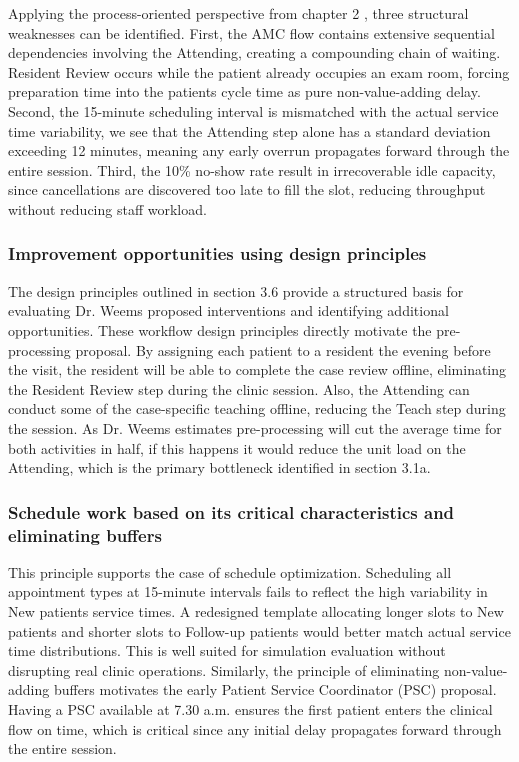 Applying the process-oriented perspective from chapter 2 \parencite{pensumbok}, three structural weaknesses can be identified. First, the AMC flow contains extensive sequential dependencies involving the Attending, creating a compounding chain of waiting. Resident Review occurs while the patient already occupies an exam room, forcing preparation time into the patients cycle time as pure non-value-adding delay. Second, the 15-minute scheduling interval is mismatched with the actual service time variability, we see that the Attending step alone has a standard deviation exceeding 12 minutes, meaning any early overrun propagates forward through the entire session. Third, the 10\% no-show rate result in irrecoverable idle capacity, since cancellations are discovered too late to fill the slot, reducing throughput without reducing staff workload. 

\subsubsection{Improvement opportunities using design principles}

The design principles outlined in section 3.6 \cite[p. 100-101]{pensumbok} provide a structured basis for evaluating Dr. Weems proposed interventions and identifying additional opportunities. These workflow design principles directly motivate the pre-processing proposal. By assigning each patient to a resident the evening before the visit, the resident will be able to complete the case review offline, eliminating the Resident Review step during the clinic session. Also, the Attending can conduct some of the case-specific teaching offline, reducing the Teach step during the session. As Dr. Weems estimates pre-processing will cut the average time for both activities in half, if this happens it would reduce the unit load on the Attending, which is the primary bottleneck identified in section 3.1a. 

\subsubsection{Schedule work based on its critical characteristics and eliminating buffers}

This principle supports the case of schedule optimization. Scheduling all appointment types at 15-minute intervals fails to reflect the high variability in New patients service times. A redesigned template allocating longer slots to New patients and shorter slots to Follow-up patients would better match actual service time distributions. This is well suited for simulation evaluation without disrupting real clinic operations. Similarly, the principle of eliminating non-value-adding buffers motivates the early Patient Service Coordinator (PSC) proposal. Having a PSC available at 7.30 a.m. ensures the first patient enters the clinical flow on time, which is critical since any initial delay propagates forward through the entire session. 


